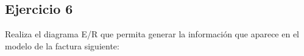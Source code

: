             
            
            

\newpage
\subsection*{Ejercicio 6}

Realiza el diagrama E/R que permita generar la información que aparece en el modelo de la factura siguiente: 


